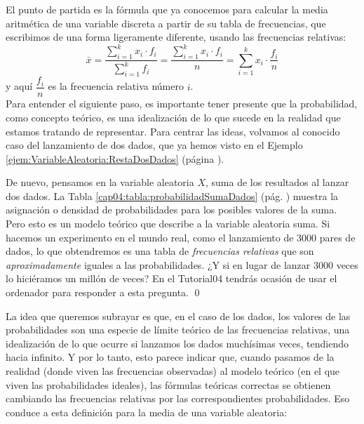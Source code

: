 El punto de partida es la fórmula que ya conocemos para calcular la media aritmética de una variable discreta a partir de su tabla de frecuencias, que escribimos de una forma ligeramente diferente, usando las frecuencias relativas:
    \[
    \bar x=\dfrac{\displaystyle\sum_{i=1}^k x_i\cdot f_i}{\displaystyle\sum_{i=1}^k f_i}
    =\dfrac{\displaystyle\sum_{i=1}^k x_i\cdot f_i}{n}
    =\displaystyle\sum_{i=1}^k x_i\cdot \dfrac{f_i}{n}
    \]
y aquí $\dfrac{f_i}{n}$ es la frecuencia relativa número $i$.\\[3mm]
Para entender el siguiente paso, es importante tener presente que la probabilidad, como concepto teórico, es una idealización de lo que sucede en la realidad que estamos tratando de representar. Para centrar las ideas, volvamos al conocido caso del lanzamiento de dos dados, que ya hemos visto en el Ejemplo \ref{ejem:VariableAleatoria:RestaDosDados} (página \pageref{ejem:VariableAleatoria:RestaDosDados}).
\begin{Ejemplo}
\label{ejem:Cap04-VariableAleatoria:SumaDosDados}
    De nuevo, pensamos en la variable aleatoria $X$, suma de los resultados al lanzar dos dados.
    La Tabla \ref{cap04:tabla:probabilidadSumaDados} (pág. \pageref{cap04:tabla:probabilidadSumaDados}) muestra la asignación o densidad de probabilidades para los posibles valores de la suma. Pero esto es un modelo teórico que describe a la variable aleatoria suma. Si hacemos un experimento en el mundo real, como el lanzamiento de 3000 pares de dados, lo que obtendremos es una tabla de {\em frecuencias relativas} que son {\em aproximadamente} iguales a las probabilidades. ¿Y si en lugar de lanzar 3000 veces lo hiciéramos un millón de veces? En el Tutorial04 tendrás ocasión de usar el ordenador para responder a esta pregunta.
    \qed
\end{Ejemplo}
La idea que queremos subrayar es que, en el caso de los dados, los valores de las probabilidades son una especie de límite teórico de las frecuencias relativas, una idealización de lo que ocurre si lanzamos los dados muchísimas veces, tendiendo hacia infinito. Y por lo tanto, esto parece indicar que, cuando pasamos de la realidad (donde viven las frecuencias observadas) al modelo teórico (en el que viven las probabilidades ideales), las fórmulas teóricas correctas se obtienen cambiando las frecuencias relativas por las correspondientes probabilidades. Eso conduce a esta definición para la media de una variable aleatoria:
